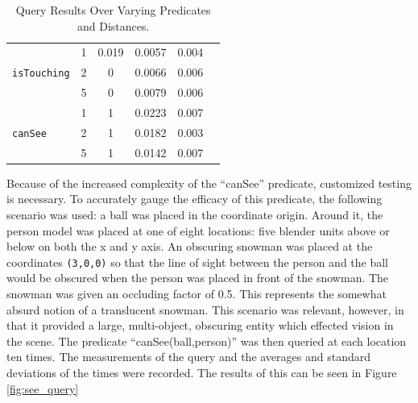\begin{table}[h]
\begin{tabular}{|l | c | c | c | c | c |}
		\multirow{3}{*}{\texttt{isTouching}} & 1 & 0.019 & 0.0057 & 0.004 \\\cline{2-5}
		& 2 & 0 & 0.0066 & 0.006 \\\cline{2-5} 
		& 5 & 0 & 0.0079 & 0.006 \\\hline 
		\multirow{3}{*}{\texttt{canSee}} & 1 & 1 & 0.0223 & 0.007 \\\cline{2-5}
		& 2 & 1 & 0.0182 & 0.003 \\\cline{2-5}
		& 5 & 1 & 0.0142 & 0.007 \\\hline 
	\end{tabular}
	\caption{Query Results Over Varying Predicates and Distances.}
	\label{table:query_results}
\end{table}

Because of the increased complexity of the ``canSee'' predicate, customized testing is necessary. 
To accurately gauge the efficacy of this predicate, the following scenario was used: a ball was placed in the coordinate origin. 
Around it, the person model was placed at one of eight locations: five blender units above or below on both the x and y axis.
An obscuring snowman was placed at the coordinates \texttt{(3,0,0)} so that the line of sight between the person and the ball would be obscured when the person was placed in front of the snowman.
The snowman was given an occluding factor of 0.5. This represents the somewhat absurd notion of a translucent snowman. 
This scenario was relevant, however, in that it provided a large, multi-object, obscuring entity which effected vision in the scene.
The predicate ``canSee(ball,person)'' was then queried at each location ten times. 
The measurements of the query and the averages and standard deviations of the times were recorded.
The results of this can be seen in Figure \ref{fig:see_query}
